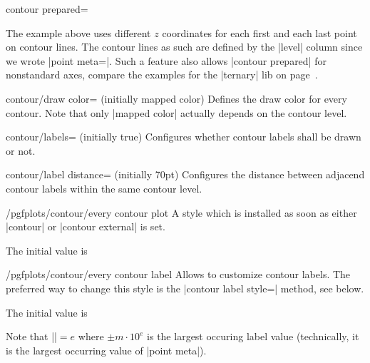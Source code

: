 {{\begin{plottype}[/pgfplots]{contour prepared=\textcolor{black}{}}
\begin{codeexample}[]
\end{codeexample}
	\noindent The example above uses different $z$ coordinates for each first and each last point on contour lines. The contour lines as such are defined by the |level| column since we wrote |point meta=|. Such a feature also allows |contour prepared| for nonstandard axes, compare the examples for the |ternary| lib on page~\pageref{page:ternary:contour}.

	\begin{pgfplotskey}{contour/draw color= (initially mapped color)}
		Defines the draw color for every contour. Note that only |mapped color| actually depends on the contour level.
	\end{pgfplotskey}

	\begin{pgfplotskey}{contour/labels= (initially true)}
		Configures whether contour labels shall be drawn or not.
	\end{pgfplotskey}
	\begin{pgfplotskey}{contour/label distance= (initially 70pt)}
		Configures the distance between adjacend contour labels within the same contour level.
	\end{pgfplotskey}

	\begin{stylekey}{/pgfplots/contour/every contour plot}
		A style which is installed as soon as either |contour| or |contour external| is set.

		The initial value is
\begin{codeexample}
\end{codeexample}
	\end{stylekey}

	\begin{stylekey}{/pgfplots/contour/every contour label}
		Allows to customize contour labels. The preferred way to change this style is the |contour label style=| method, see below.

		The initial value is
\begin{codeexample}
\end{codeexample}
	\noindent Note that |\pgfplotspointmetarangeexponent|$=e$ where $\pm m \cdot 10^e$ is the largest occuring label value (technically, it is the largest occurring value of |point meta|).


\end{stylekey}
\end{plottype}}}

